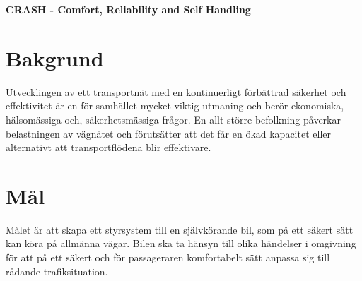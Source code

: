 \documentclass[10pt]{article}
\date{}
\begin{document}

\begin{center}
{\Large
\textbf{CRASH - Comfort, Reliability and Self Handling}
}
\end{center}


\tableofcontents
\newpage

\section{Bakgrund}
\sloppy
\noindent Utvecklingen av ett transportnät med en kontinuerligt förbättrad säkerhet och effektivitet är en för samhället mycket viktig utmaning och berör ekonomiska, hälsomässiga och, säkerhetsmässiga frågor. En allt större befolkning påverkar belastningen av vägnätet och förutsätter att det får en ökad kapacitet eller alternativt att transportflödena blir effektivare.

\section{Mål}
\sloppy
\noindent Målet är att skapa ett styrsystem till en självkörande bil, som på ett säkert sätt kan köra på allmänna vägar. Bilen ska ta hänsyn till olika händelser i omgivning för att på ett säkert och för passageraren komfortabelt sätt anpassa sig till rådande trafiksituation. 

\end{document}
